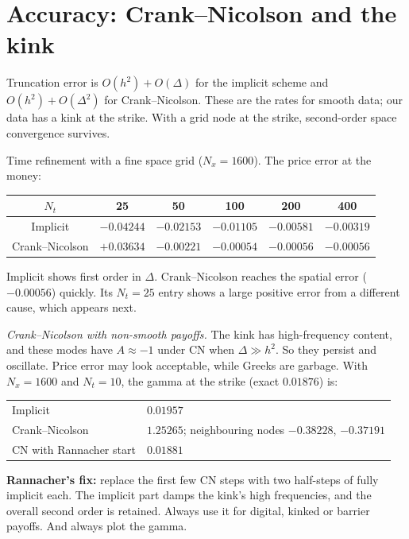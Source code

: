 \section{Accuracy: Crank--Nicolson and the kink}

Truncation error is $O(h^2)+O(\Delta)$ for the implicit scheme and $O(h^2)+O(\Delta^2)$ for Crank--Nicolson. These are the rates for smooth data; our data has a kink at the strike. With a grid node at the strike, second-order space convergence survives.

\begin{numcheck}
Time refinement with a fine space grid ($N_x=1600$). The price error at the money:
\begin{center}
\begin{tabular}{cccccc}
\toprule
$N_t$ & 25 & 50 & 100 & 200 & 400\\
\midrule
Implicit & $-0.04244$ & $-0.02153$ & $-0.01105$ & $-0.00581$ & $-0.00319$\\
Crank--Nicolson & $+0.03634$ & $-0.00221$ & $-0.00054$ & $-0.00056$ & $-0.00056$\\
\bottomrule
\end{tabular}
\end{center}
Implicit shows first order in $\Delta$. Crank--Nicolson reaches the spatial error ($-0.00056$) quickly. Its $N_t=25$ entry shows a large positive error from a different cause, which appears next.
\end{numcheck}

\begin{pitfall}
\emph{Crank--Nicolson with non-smooth payoffs.} The kink has high-frequency content, and these modes have $A\approx-1$ under CN when $\Delta\gg h^2$. So they persist and oscillate. Price error may look acceptable, while Greeks are garbage. With $N_x=1600$ and $N_t=10$, the gamma at the strike (exact $0.01876$) is:
\begin{center}
\begin{tabular}{ll}
\toprule
Implicit & $0.01957$\\
Crank--Nicolson & $1.25265$; neighbouring nodes $-0.38228$, $-0.37191$\\
CN with Rannacher start & $0.01881$\\
\bottomrule
\end{tabular}
\end{center}
\textbf{Rannacher's fix:} replace the first few CN steps with two half-steps of fully implicit each. The implicit part damps the kink's high frequencies, and the overall second order is retained. Always use it for digital, kinked or barrier payoffs. And always plot the gamma.
\end{pitfall}

